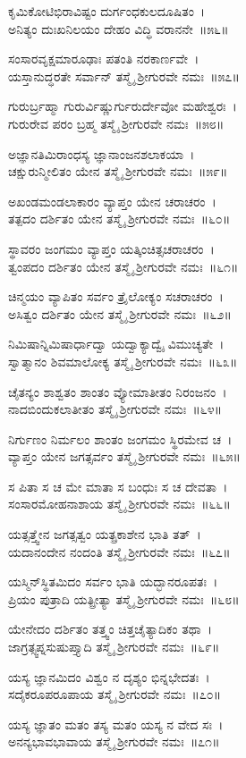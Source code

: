 ಕೃಮಿಕೋಟಿಭಿರಾವಿಷ್ಟಂ ದುರ್ಗಂಧಕುಲದೂಷಿತಂ~।\\
ಅನಿತ್ಯಂ ದುಃಖನಿಲಯಂ ದೇಹಂ ವಿದ್ಧಿ ವರಾನನೇ~॥೫೬॥

ಸಂಸಾರವೃಕ್ಷಮಾರೂಢಾಃ ಪತಂತಿ ನರಕಾರ್ಣವೇ~।\\
ಯಸ್ತಾನುದ್ಧರತೇ ಸರ್ವಾನ್ ತಸ್ಮೈ ಶ್ರೀಗುರವೇ ನಮಃ~॥೫೭॥

ಗುರುರ್ಬ್ರಹ್ಮಾ ಗುರುರ್ವಿಷ್ಣುರ್ಗುರುರ್ದೇವೋ ಮಹೇಶ್ವರಃ~।\\
ಗುರುರೇವ ಪರಂ ಬ್ರಹ್ಮ ತಸ್ಮೈ ಶ್ರೀಗುರವೇ ನಮಃ~॥೫೮॥

ಅಜ್ಞಾನತಿಮಿರಾಂಧಸ್ಯ ಜ್ಞಾನಾಂಜನಶಲಾಕಯಾ~।\\
ಚಕ್ಷುರುನ್ಮೀಲಿತಂ ಯೇನ ತಸ್ಮೈ ಶ್ರೀಗುರವೇ ನಮಃ~॥೫೯॥

ಅಖಂಡಮಂಡಲಾಕಾರಂ ವ್ಯಾಪ್ತಂ ಯೇನ ಚರಾಚರಂ~।\\
ತತ್ಪದಂ ದರ್ಶಿತಂ ಯೇನ ತಸ್ಮೈ ಶ್ರೀಗುರವೇ ನಮಃ~॥೬೦॥

ಸ್ಥಾವರಂ ಜಂಗಮಂ ವ್ಯಾಪ್ತಂ ಯತ್ಕಿಂಚಿತ್ಸಚರಾಚರಂ~।\\
ತ್ವಂಪದಂ ದರ್ಶಿತಂ ಯೇನ ತಸ್ಮೈ ಶ್ರೀಗುರವೇ ನಮಃ~॥೬೧॥

ಚಿನ್ಮಯಂ ವ್ಯಾಪಿತಂ ಸರ್ವಂ ತ್ರೈಲೋಕ್ಯಂ ಸಚರಾಚರಂ~।\\
ಅಸಿತ್ವಂ ದರ್ಶಿತಂ ಯೇನ ತಸ್ಮೈ ಶ್ರೀಗುರವೇ ನಮಃ~॥೬೨॥

ನಿಮಿಷಾನ್ನಿಮಿಷಾರ್ಧಾದ್ವಾ ಯದ್ವಾಕ್ಯಾದ್ವೈ ವಿಮುಚ್ಯತೇ~।\\
ಸ್ವಾತ್ಮಾನಂ ಶಿವಮಾಲೋಕ್ಯ ತಸ್ಮೈ ಶ್ರೀಗುರವೇ ನಮಃ~॥೬೩॥

ಚೈತನ್ಯಂ ಶಾಶ್ವತಂ ಶಾಂತಂ ವ್ಯೋಮಾತೀತಂ ನಿರಂಜನಂ~।\\
ನಾದಬಿಂದುಕಲಾತೀತಂ ತಸ್ಮೈ ಶ್ರೀಗುರವೇ ನಮಃ~॥೬೪॥

ನಿರ್ಗುಣಂ ನಿರ್ಮಲಂ ಶಾಂತಂ ಜಂಗಮಂ ಸ್ಥಿರಮೇವ ಚ~।\\
ವ್ಯಾಪ್ತಂ ಯೇನ ಜಗತ್ಸರ್ವಂ ತಸ್ಮೈ ಶ್ರೀಗುರವೇ ನಮಃ~॥೬೫॥

ಸ ಪಿತಾ ಸ ಚ ಮೇ ಮಾತಾ ಸ ಬಂಧುಃ ಸ ಚ ದೇವತಾ~।\\
ಸಂಸಾರಮೋಹನಾಶಾಯ ತಸ್ಮೈ ಶ್ರೀಗುರವೇ ನಮಃ~॥೬೬॥

ಯತ್ಸತ್ತ್ವೇನ ಜಗತ್ಸತ್ವಂ ಯತ್ಪ್ರಕಾಶೇನ ಭಾತಿ ತತ್~।\\
ಯದಾನಂದೇನ ನಂದಂತಿ ತಸ್ಮೈ ಶ್ರೀಗುರವೇ ನಮಃ~॥೬೭॥

ಯಸ್ಮಿನ್‌ಸ್ಥಿತಮಿದಂ ಸರ್ವಂ ಭಾತಿ ಯದ್ಭಾನರೂಪತಃ~।\\
ಪ್ರಿಯಂ ಪುತ್ರಾದಿ ಯತ್ಪ್ರೀತ್ಯಾ ತಸ್ಮೈ ಶ್ರೀಗುರವೇ ನಮಃ~॥೬೮॥

ಯೇನೇದಂ ದರ್ಶಿತಂ ತತ್ತ್ವಂ ಚಿತ್ತಚೈತ್ಯಾದಿಕಂ ತಥಾ~।\\
ಜಾಗ್ರತ್ಸ್ವಪ್ನಸುಷುಪ್ತ್ಯಾದಿ ತಸ್ಮೈ ಶ್ರೀಗುರವೇ ನಮಃ~॥೬೯॥

ಯಸ್ಯ ಜ್ಞಾನಮಿದಂ ವಿಶ್ವಂ ನ ದೃಶ್ಯಂ ಭಿನ್ನಭೇದತಃ~।\\
ಸದೈಕರೂಪರೂಪಾಯ ತಸ್ಮೈ ಶ್ರೀಗುರವೇ ನಮಃ~॥೭೦॥

ಯಸ್ಯ ಜ್ಞಾತಂ ಮತಂ ತಸ್ಯ ಮತಂ ಯಸ್ಯ ನ ವೇದ ಸಃ~।\\
ಅನನ್ಯಭಾವಭಾವಾಯ ತಸ್ಮೈ ಶ್ರೀಗುರವೇ ನಮಃ~॥೭೧॥

